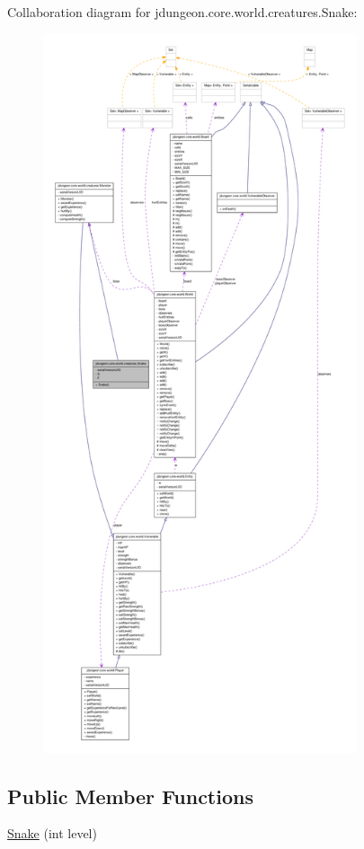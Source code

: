 Collaboration diagram for jdungeon.core.world.creatures.Snake:
\nopagebreak
\begin{figure}[H]
\begin{center}
\leavevmode
\includegraphics[height=600pt]{classjdungeon_1_1core_1_1world_1_1creatures_1_1_snake__coll__graph}
\end{center}
\end{figure}
\subsection*{Public Member Functions}
\begin{DoxyCompactItemize}
\item 
\hyperlink{classjdungeon_1_1core_1_1world_1_1creatures_1_1_snake_ad7b8f4445f343b8cc55650ca3951a9fb}{Snake} (int level)
\end{DoxyCompactItemize}


